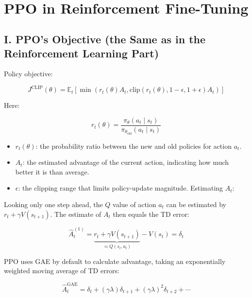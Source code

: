 \setcounter{section}{5}

\hypertarget{ppo-in-reinforcement-fine-tuning}{%
\section{PPO in Reinforcement Fine-Tuning}\label{ppo-in-reinforcement-fine-tuning}}

\hypertarget{i.-ppos-objective-the-same-as-in-the-reinforcement-learning-part}{%
\subsection{I. PPO's Objective (the Same as in the Reinforcement Learning Part)}\label{i.-ppos-objective-the-same-as-in-the-reinforcement-learning-part}}

Policy objective:

\[
J^{\mathrm{CLIP}}(\theta)
=
\mathbb{E}_t\left[
\min\left(
r_t(\theta)A_t,
\mathrm{clip}(r_t(\theta), 1-\epsilon, 1+\epsilon)A_t
\right)
\right]
\]

Here:

\[
r_t(\theta)=\frac{\pi_\theta(a_t \mid s_t)}{\pi_{\theta_{\mathrm{old}}}(a_t \mid s_t)}
\]

\begin{itemize}
\tightlist
\item
  \(r_t(\theta)\): the probability ratio between the new and old policies for action \(a_t\).
\item
  \(A_t\): the estimated advantage of the current action, indicating how much better it is than average.
\item
  \(\epsilon\): the clipping range that limits policy-update magnitude.
  Estimating \(A_t\):
\end{itemize}

Looking only one step ahead, the \(Q\) value of action \(a_t\) can be estimated by \(r_t + \gamma V(s_{t+1})\). The estimate of \(A_t\) then equals the TD error:

\[
\hat{A}_t^{(1)}
=
\underbrace{r_t + \gamma V(s_{t+1})}_{\approx Q(s_t,a_t)}
- V(s_t)
=
\delta_t
\]

PPO uses GAE by default to calculate advantage, taking an exponentially weighted moving average of TD errors:

\[
\hat{A}_t^{\mathrm{GAE}}
=
\delta_t
+
(\gamma\lambda)\delta_{t+1}
+
(\gamma\lambda)^2\delta_{t+2}
+
\cdots
\]

